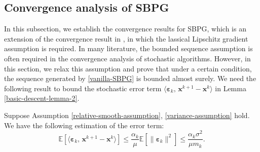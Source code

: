 \documentclass[twoside,11pt]{article}
\newcommand{\E}{\mathbb{E}}
\def\inprod#1#2{\langle#1,\,#2\rangle}
\def\vx{{\bm{x}}}
\begin{document}
\subsection{Convergence analysis of SBPG}

 In this subsection, we establish the convergence results for SBPG, which is an extension of the convergence result in \cite{ghadimi2016mini}, in which the lassical Lipschitz gradient assumption is required. In many literature, the bounded sequence assumption is often required in the convergence analysis of stochastic algorithms. However, in this section, we relax this assumption and prove that under a certain condition, the sequence generated by \eqref{vanilla-SBPG} is bounded almost surely. We need the following result to bound the stochastic error term $\inprod{{\bm\varepsilon}_k}{{\vx^{k+1}}-{\vx^k}}$ in Lemma \ref{basic-descent-lemma-2}.
\begin{lemma}
Suppose Assumption \ref{relative-smooth-assumption}, \ref{variance-assumption} hold. We have the following estimation of the error term:
\[
\mathbb E\left[\inprod{{\bm\varepsilon}_k}{{\vx^{k+1}}-{\vx^k}}\right]\leq\frac{\alpha_k}{\mu}\E[\|{\bm\varepsilon}_k\|^2]\leq\frac{\alpha_k\sigma^2}{\mu m_k}.
\]
\label{inprod-bound}
\end{lemma}
\end{document}
